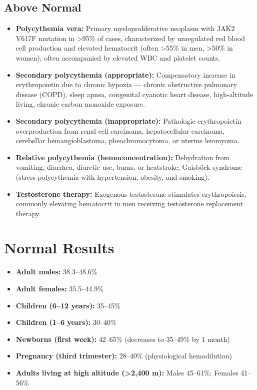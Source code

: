 \subsection*{Above Normal}
\begin{itemize}
  \item \textbf{Polycythemia vera:} Primary myeloproliferative neoplasm with JAK2 V617F mutation in >95\% of cases, characterized by unregulated red blood cell production and elevated hematocrit (often >55\% in men, >50\% in women), often accompanied by elevated WBC and platelet counts.
  \item \textbf{Secondary polycythemia (appropriate):} Compensatory increase in erythropoietin due to chronic hypoxia --- chronic obstructive pulmonary disease (COPD), sleep apnea, congenital cyanotic heart disease, high-altitude living, chronic carbon monoxide exposure.
  \item \textbf{Secondary polycythemia (inappropriate):} Pathologic erythropoietin overproduction from renal cell carcinoma, hepatocellular carcinoma, cerebellar hemangioblastoma, pheochromocytoma, or uterine leiomyoma.
  \item \textbf{Relative polycythemia (hemoconcentration):} Dehydration from vomiting, diarrhea, diuretic use, burns, or heatstroke; Gaisb\"{o}ck syndrome (stress polycythemia with hypertension, obesity, and smoking).
  \item \textbf{Testosterone therapy:} Exogenous testosterone stimulates erythropoiesis, commonly elevating hematocrit in men receiving testosterone replacement therapy.
\end{itemize}

\section*{Normal Results}
\begin{itemize}
  \item \textbf{Adult males:} 38.3--48.6\% \cite{fischbach2023manual}
  \item \textbf{Adult females:} 35.5--44.9\%
  \item \textbf{Children (6--12 years):} 35--45\%
  \item \textbf{Children (1--6 years):} 30--40\%
  \item \textbf{Newborns (first week):} 42--65\% (decreases to 35--49\% by 1 month)
  \item \textbf{Pregnancy (third trimester):} 28--40\% (physiological hemodilution)
  \item \textbf{Adults living at high altitude (>2,400 m):} Males 45--61\%; Females 41--56\%
\end{itemize}

